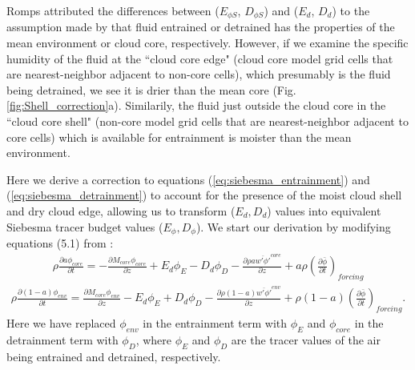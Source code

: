 \documentclass[12pt]{article}
\begin{document}
Romps attributed the differences between ($E_{\phi S}$, $D_{\phi S}$) and 
($E_d$, $D_d$) to the assumption made by \cite{Siebesma1995} that fluid 
entrained or detrained has the properties of the mean environment or 
cloud core, respectively.  However, if we examine the specific 
humidity of the fluid at the ``cloud core edge" (cloud core model grid 
cells that are nearest-neighbor adjacent to non-core cells), which 
presumably is the fluid being detrained, we see it is drier than the mean 
core (Fig. \ref{fig:Shell_correction}a).  Similarily, the fluid just 
outside the cloud core in the ``cloud core shell" (non-core model 
grid cells that are nearest-neighbor adjacent to core cells) which is 
available for entrainment is moister than the mean environment.
  
Here we derive a correction to equations (\ref{eq:siebesma_entrainment}) and 
(\ref{eq:siebesma_detrainment}) to account for the presence of the moist cloud 
shell and dry cloud edge, allowing us to transform ($E_d, D_d$) values into 
equivalent Siebesma tracer budget values ($E_{\phi}, D_{\phi}$).  We start
our derivation by modifying equations (5.1) from
\cite{Siebesma1995}:
\begin{eqnarray}
  \label{eq:entrainment_derivation_1}
    \rho \frac{\partial a \phi_{core}}{\partial t} 
    = - \frac{\partial M_{core} \phi_{core}}{\partial z} 
    + E_d \phi_E - D_d \phi_D
    - \frac{\partial \rho a \overline{w' \phi'}^{core}}{\partial z} 
    + a \rho \left(\frac{\partial \bar{\phi}}{\partial t}\right)_{forcing}
\end{eqnarray}
\begin{eqnarray}
  \label{eq:detrainment_derivation_1}
    \rho \frac{\partial (1 - a) \phi_{env}}{\partial t}
    = \frac{\partial M_{core} \phi_{env}}{\partial z} 
    - E_d \phi_E + D_d \phi_D
    - \frac{\partial \rho (1 - a) \overline{w' \phi'}^{env}}{\partial z} 
    + \rho (1 - a) \left(\frac{\partial \bar{\phi}}{\partial t}\right)_{forcing}.
\end{eqnarray}
Here we have replaced $\phi_{env}$ in the entrainment term with $\phi_E$ and 
$\phi_{core}$ in the detrainment term with $\phi_D$, where $\phi_E$ and $\phi_D$
are the tracer values of the air being entrained and detrained, respectively.
\end{document}
